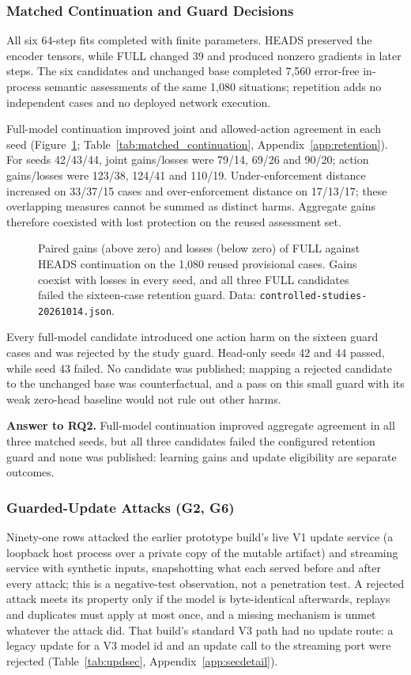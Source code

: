 \documentclass[sigconf]{acmart}
\theoremstyle{acmdefinition}\newtheorem{property}{Property}
\begin{document}
\subsubsection{Matched Continuation and Guard Decisions}
All six 64-step fits completed with finite parameters. HEADS preserved the encoder tensors, while FULL changed 39 and produced nonzero gradients in later steps. The six candidates and unchanged base completed 7,560 error-free in-process semantic assessments of the same 1,080 situations; repetition adds no independent cases and no deployed network execution.

Full-model continuation improved joint and allowed-action agreement in each seed (Figure~\ref{fig:rq2}; Table~\ref{tab:matched_continuation}, Appendix~\ref{app:retention}). For seeds 42/43/44, joint gains/losses were 79/14, 69/26 and 90/20; action gains/losses were 123/38, 124/41 and 110/19. Under-enforcement distance increased on 33/37/15 cases and over-enforcement distance on 17/13/17; these overlapping measures cannot be summed as distinct harms. Aggregate gains therefore coexisted with lost protection on the reused assessment set.

\begin{figure}[t]
\centering

\caption{Paired gains (above zero) and losses (below zero) of FULL against HEADS continuation on the 1,080 reused provisional cases. Gains coexist with losses in every seed, and all three FULL candidates failed the sixteen-case retention guard. Data: \texttt{controlled-studies-20261014.json}.}
\label{fig:rq2}
\end{figure}

Every full-model candidate introduced one action harm on the sixteen guard cases and was rejected by the study guard. Head-only seeds 42 and 44 passed, while seed 43 failed. No candidate was published; mapping a rejected candidate to the unchanged base was counterfactual, and a pass on this small guard with its weak zero-head baseline would not rule out other harms.

\textbf{Answer to RQ2.} Full-model continuation improved aggregate agreement in all three matched seeds, but all three candidates failed the configured retention guard and none was published: learning gains and update eligibility are separate outcomes.

\subsubsection{Guarded-Update Attacks (G2, G6)}
\label{sec:eval_update}
Ninety-one rows attacked the earlier prototype build's live V1 update service (a loopback host process over a private copy of the mutable artifact) and streaming service with synthetic inputs, snapshotting what each served before and after every attack; this is a negative-test observation, not a penetration test. A rejected attack meets its property only if the model is byte-identical afterwards, replays and duplicates must apply at most once, and a missing mechanism is unmet whatever the attack did. That build's standard V3 path had no update route: a legacy update for a V3 model id and an update call to the streaming port were rejected (Table~\ref{tab:updsec}, Appendix~\ref{app:secdetail}).
\end{document}
